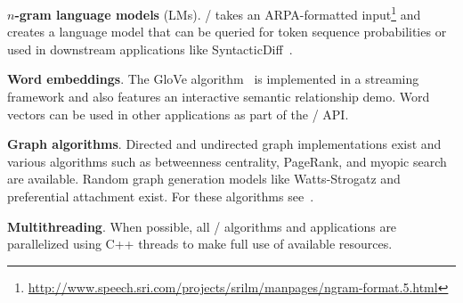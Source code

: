 \textbf{$n$-gram language models} (LMs).
\meta/ takes an ARPA-formatted
input\footnote{\url{http://www.speech.sri.com/projects/srilm/manpages/ngram-format.5.html}}
and creates a language model that can be queried for token sequence
probabilities or used in downstream applications like
SyntacticDiff~\cite{syndiff}.

\textbf{Word embeddings}.
The GloVe algorithm~\cite{glove} is implemented in a streaming framework and
also features an interactive semantic relationship demo. Word vectors can be
used in other applications as part of the \meta/ API\@.

\textbf{Graph algorithms}.
Directed and undirected graph implementations exist and various algorithms such
as betweenness centrality, PageRank, and myopic search are available. Random
graph generation models like Watts-Strogatz and preferential attachment exist.
For these algorithms see~\cite{networks}.

\textbf{Multithreading}.
When possible, all \meta/ algorithms and applications are parallelized using C++
threads to make full use of available resources.
